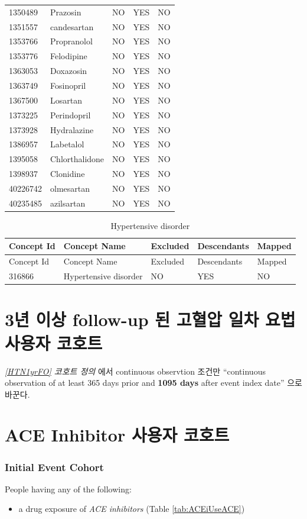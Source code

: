 \documentclass[10.5pt]{book}
\providecommand{\tightlist}{%
  \setlength{\itemsep}{0pt}\setlength{\parskip}{0pt}}
\theoremstyle{definition}
\theoremstyle{definition}
\theoremstyle{definition}
\theoremstyle{remark}
\begin{document}
\begin{longtable}[]{@{}lllll@{}}
1350489 & Prazosin & NO & YES & NO\tabularnewline
1351557 & candesartan & NO & YES & NO\tabularnewline
1353766 & Propranolol & NO & YES & NO\tabularnewline
1353776 & Felodipine & NO & YES & NO\tabularnewline
1363053 & Doxazosin & NO & YES & NO\tabularnewline
1363749 & Fosinopril & NO & YES & NO\tabularnewline
1367500 & Losartan & NO & YES & NO\tabularnewline
1373225 & Perindopril & NO & YES & NO\tabularnewline
1373928 & Hydralazine & NO & YES & NO\tabularnewline
1386957 & Labetalol & NO & YES & NO\tabularnewline
1395058 & Chlorthalidone & NO & YES & NO\tabularnewline
1398937 & Clonidine & NO & YES & NO\tabularnewline
40226742 & olmesartan & NO & YES & NO\tabularnewline
40235485 & azilsartan & NO & YES & NO\tabularnewline
\bottomrule
\end{longtable}

\begin{longtable}[]{@{}lllll@{}}
\caption{\label{tab:HTN1yrFOHypertensiveDisorder} Hypertensive
disorder}\tabularnewline
\toprule
Concept Id & Concept Name & Excluded & Descendants &
Mapped\tabularnewline
\midrule
\endfirsthead
\toprule
Concept Id & Concept Name & Excluded & Descendants &
Mapped\tabularnewline
\midrule
\endhead
316866 & Hypertensive disorder & NO & YES & NO\tabularnewline
\bottomrule
\end{longtable}

\section{3년 이상 follow-up 된 고혈압 일차 요법 사용자
코호트}\label{HTN3yrFO}

\emph{\ref{HTN1yrFO} 코호트 정의 } 에서 continuous observtion 조건만
``continuous observation of at least 365 days prior and \textbf{1095
days} after event index date'' 으로 바꾼다.

\section{ACE Inhibitor 사용자 코호트}\label{ACEiUse}

\subsubsection*{Initial Event Cohort}\label{initial-event-cohort-6}

People having any of the following:

\begin{itemize}
\tightlist
\item
  a drug exposure of \emph{ACE inhibitors} (Table \ref{tab:ACEiUseACE})
\end{itemize}
\end{document}
